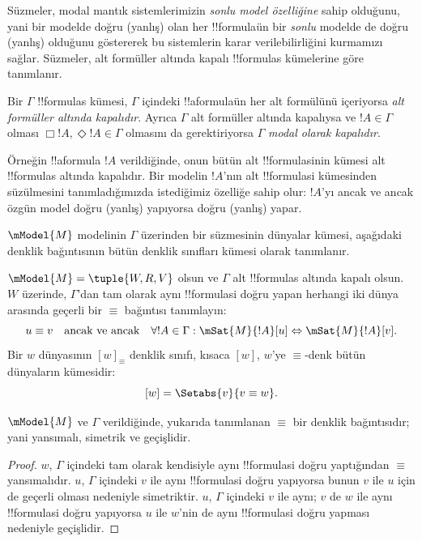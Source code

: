 \documentclass[../../../include/open-logic-section]{subfiles}
\begin{document}


Süzmeler, modal mantık sistemlerimizin \emph{sonlu model özelliğine} sahip
olduğunu, yani bir modelde doğru (yanlış) olan her !!{formula}{}ün bir
\emph{sonlu} modelde de doğru (yanlış) olduğunu göstererek bu sistemlerin
karar verilebilirliğini kurmamızı sağlar. Süzmeler, alt formüller altında
kapalı !!{formula}s kümelerine göre tanımlanır.

\begin{defn}
  Bir $\Gamma$ !!{formula}s kümesi, $\Gamma$ içindeki !!a{formula}{}ün her
  alt formülünü içeriyorsa \emph{alt formüller altında kapalıdır}. Ayrıca
  $\Gamma$ alt formüller altında kapalıysa ve $!A\in\Gamma$ olması
  $\Box!A,\Diamond!A\in\Gamma$ olmasını da gerektiriyorsa $\Gamma$
  \emph{modal olarak kapalıdır}.
\end{defn}

Örneğin !!a{formula} $!A$ verildiğinde, onun bütün alt !!{formula}s{}inin
kümesi alt !!{formula}s altında kapalıdır. Bir modelin $!A$'nın alt
!!{formula}s{}i kümesinden süzülmesini tanımladığımızda istediğimiz özelliğe
sahip olur: $!A$'yı ancak ve ancak özgün model doğru (yanlış) yapıyorsa doğru
(yanlış) yapar.

$\mModel{M}$ modelinin $\Gamma$ üzerinden bir süzmesinin dünyalar kümesi,
aşağıdaki denklik bağıntısının bütün denklik sınıfları kümesi olarak
tanımlanır.

\begin{defn}
$\mModel{M}=\tuple{W,R,V}$ olsun ve $\Gamma$ alt !!{formula}s altında
kapalı olsun. $W$ üzerinde, $\Gamma$'dan tam olarak aynı !!{formula}s{}i doğru
yapan herhangi iki dünya arasında geçerli bir $\equiv$ bağıntısı tanımlayın:
\[
u \equiv v \quad \text{ancak ve ancak} \quad
\forall !A \in \Gamma : \mSat{M}{!A}[u] \Leftrightarrow \mSat{M}{!A}[v].
\]
Bir $w$ dünyasının $[w]_\equiv$ denklik sınıfı, kısaca $[w]$, $w$'ye
$\equiv$-denk bütün dünyaların kümesidir:
\[
[w] = \Setabs{v}{v \equiv w}.
\]
\end{defn}

\begin{prop}
  $\mModel{M}$ ve $\Gamma$ verildiğinde, yukarıda tanımlanan $\equiv$ bir
  denklik bağıntısıdır; yani yansımalı, simetrik ve geçişlidir.
\end{prop}

\begin{proof}
  $w$, $\Gamma$ içindeki tam olarak kendisiyle aynı !!{formula}s{}i doğru
  yaptığından $\equiv$ yansımalıdır. $u$, $\Gamma$ içindeki $v$ ile aynı
  !!{formula}s{}i doğru yapıyorsa bunun $v$ ile $u$ için de geçerli olması
  nedeniyle simetriktir. $u$, $\Gamma$ içindeki $v$ ile aynı; $v$ de $w$
  ile aynı !!{formula}s{}i doğru yapıyorsa $u$ ile $w$'nin de aynı
  !!{formula}s{}i doğru yapması nedeniyle geçişlidir.
\end{proof}
\end{document}
